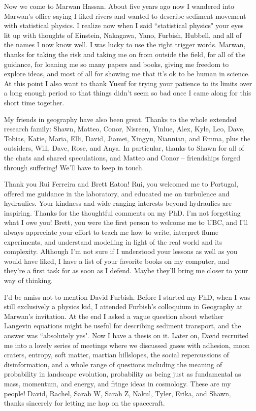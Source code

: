 Now we come to Marwan Hassan. About five years ago now I wandered into Marwan's office saying I liked rivers and wanted to describe sediment movement with statistical physics. I realize now when I said ``statistical physics" your eyes lit up with thoughts of Einstein, Nakagawa, Yano, Furbish, Hubbell, and all of the names I now know well. I was lucky to use the right trigger words.
Marwan, thanks for taking the risk and taking me on from outside the field, for all of the guidance, for loaning me so many papers and books, giving me freedom to explore ideas, and most of all for showing me that it's ok to be human in science. At this point I also want to thank Yusuf for trying your patience to its limits over a long enough period so that things didn't seem so bad once I came along for this short time together.

My friends in geography have also been great. Thanks to the whole extended research family: Shawn, Matteo, Conor, Nisreen, Yinlue, Alex, Kyle, Leo, Dave, Tobias, Katie, Maria, Elli, David, Jiamei, Xingyu, Niannian, and Emma, plus the outsiders, Will, Dave, Rose, and Anya. In particular, thanks to Shawn for all of the chats and shared speculations, and Matteo and Conor -- friendships forged through suffering! We'll have to keep in touch.

Thank you Rui Ferreira and Brett Eaton!
Rui, you welcomed me to Portugal, offered me guidance in the laboratory, and educated me on turbulence and hydraulics. Your kindness and wide-ranging interests beyond hydraulics are inspiring. Thanks for the thoughtful comments on my PhD. I'm not forgetting what I owe you! 
Brett, you were the first person to welcome me to UBC, and I'll always appreciate your effort to teach me how to write, interpret flume experiments, and understand modelling in light of the real world and its complexity. Although I'm not sure if I understood your lessons as well as you would have liked, I have a list of your favorite books on my computer, and they're a first task for as soon as I defend. Maybe they'll bring me closer to your way of thinking.

I'd be amiss not to mention David Furbish. Before I started my PhD, when I was still exclusively a physics kid, I attended Furbish's colloquium in Geography at Marwan's invitation. At the end I asked a vague question about whether Langevin equations might be useful for describing sediment transport, and the answer was ``absolutely yes". Now I have a thesis on it. Later on, David recruited me into a lovely series of meetings where we discussed gases with adhesion, moon craters, entropy, soft matter, martian hillslopes, the social repercussions of disinformation, and a whole range of questions including the meaning of probability in landscape evolution, probability as being just as fundamental as mass, momentum, and energy, and fringe ideas in cosmology. These are my people! David, Rachel, Sarah W, Sarah Z, Nakul, Tyler, Erika, and Shawn, thanks sincerely for letting me hop on the spacecraft.

